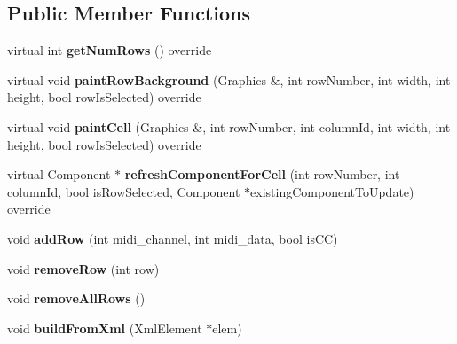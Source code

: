 \subsection*{Public Member Functions}
\begin{DoxyCompactItemize}
\item 
virtual int {\bfseries get\+Num\+Rows} () override\hypertarget{class_command_table_model_ae89ca7ee2106ffe3a8d326da313e3bf2}{}\label{class_command_table_model_ae89ca7ee2106ffe3a8d326da313e3bf2}

\item 
virtual void {\bfseries paint\+Row\+Background} (Graphics \&, int row\+Number, int width, int height, bool row\+Is\+Selected) override\hypertarget{class_command_table_model_a288a0dec11b5bbfb6fdb5bcd9c4a81ec}{}\label{class_command_table_model_a288a0dec11b5bbfb6fdb5bcd9c4a81ec}

\item 
virtual void {\bfseries paint\+Cell} (Graphics \&, int row\+Number, int column\+Id, int width, int height, bool row\+Is\+Selected) override\hypertarget{class_command_table_model_a291f0a2ace126893e8639efaa1d817a3}{}\label{class_command_table_model_a291f0a2ace126893e8639efaa1d817a3}

\item 
virtual Component $\ast$ {\bfseries refresh\+Component\+For\+Cell} (int row\+Number, int column\+Id, bool is\+Row\+Selected, Component $\ast$existing\+Component\+To\+Update) override\hypertarget{class_command_table_model_a46ef1923c37173d28bf25c840403af69}{}\label{class_command_table_model_a46ef1923c37173d28bf25c840403af69}

\item 
void {\bfseries add\+Row} (int midi\+\_\+channel, int midi\+\_\+data, bool is\+CC)\hypertarget{class_command_table_model_a34e3b342c1741fe6363e2873b68171b1}{}\label{class_command_table_model_a34e3b342c1741fe6363e2873b68171b1}

\item 
void {\bfseries remove\+Row} (int row)\hypertarget{class_command_table_model_aedd06c409a9326aa50077244c10f5dbd}{}\label{class_command_table_model_aedd06c409a9326aa50077244c10f5dbd}

\item 
void {\bfseries remove\+All\+Rows} ()\hypertarget{class_command_table_model_aa49fc1e19a98cd9c315d0faa5592758b}{}\label{class_command_table_model_aa49fc1e19a98cd9c315d0faa5592758b}

\item 
void {\bfseries build\+From\+Xml} (Xml\+Element $\ast$elem)\hypertarget{class_command_table_model_a6e319303b8e10392dec65e70607d8998}{}\label{class_command_table_model_a6e319303b8e10392dec65e70607d8998}


\end{DoxyCompactItemize}
